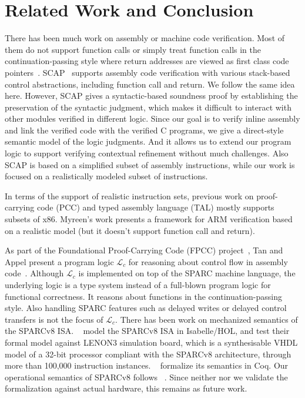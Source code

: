 \section{Related Work and Conclusion}
\label{sec:conclusion}

There has been much work on assembly or
machine code verification. Most of them
do not support function calls or simply
treat function calls in the continuation-passing
style where return addresses are viewed as first
class code pointers~\cite{PCC,FPCC,TAL,TALx86,Yu03ESOP,xcap,cflogic}.
SCAP~\cite{Feng06pldi} supports assembly code verification
with various stack-based control abstractions, including
function call and return. We follow the same idea here.
However, SCAP gives a syntactic-based soundness proof
by establishing the preservation of the syntactic judgment,
which makes it difficult to interact with other modules
verified in different logic. Since our goal is to
verify inline assembly and link the verified code
with the verified C programs, we give a direct-style
semantic model of the logic judgments. And it allows us
to extend our program logic to support verifying
contextual refinement without much challenges.
Also SCAP
is based on a simplified subset of assembly instructions,
while our work is focused on a realistically modeled
subset of \sparc{} instructions.

In terms of the support of realistic instruction sets,
previous work on proof-carrying code (PCC) and
typed assembly language (TAL) mostly supports subsets of
x86.
Myreen's work \cite{arm-veri} presents a framework for
ARM verification based on a realistic model
(but it doesn't support function call and return).

As part of the Foundational Proof-Carrying Code (FPCC)
project~\cite{FPCC},
Tan and Appel present a program logic $\mathcal{L}_c$
for reasoning about control flow in assembly code~\cite{cflogic}.
Although $\mathcal{L}_c$ is implemented
on top of the SPARC machine language,
the underlying logic is a type system instead
of a full-blown program logic for functional correctness.
It reasons about functions in the continuation-passing
style. Also
handling SPARC features such as delayed writes or delayed
control transfers is not the focus of $\mathcal{L}_c$.
There has been work on mechanized semantics of the SPARCv8 ISA.
~\cite{sparcv8-formalization-Isabelle} model the SPARCv8 ISA
in Isabelle/HOL, and test their formal model against
LENON3 simulation board,
which is a synthesisable VHDL model of a 32-bit processor
compliant with the SPARCv8 architecture,
through more than 100,000 instruction instances.
~\cite{sparc-formalization} formalize its semantics in Coq.
Our operational semantics of SPARCv8 follows ~\cite{sparc-formalization}.
Since neither  nor we validate the
formalization against actual hardware, this remains
as future work.

